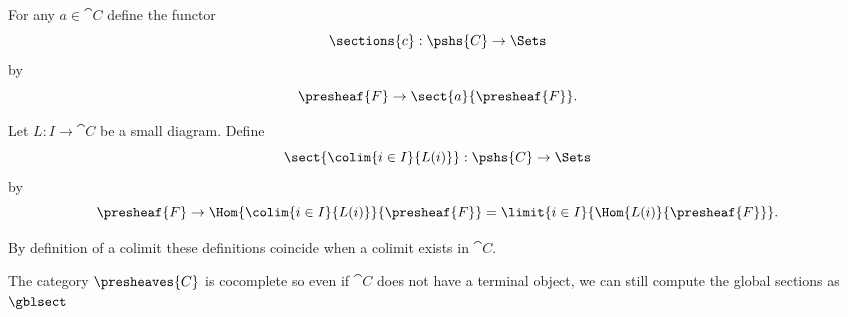 \begin{definition}
For any $a\in \cat{C}$ define the functor 
\[\sections{c}: \pshs{C} \rightarrow \Sets\]
by
\[\presheaf{F} \rightarrow \sect{a}{\presheaf{F}}.\]

Let $L: I \rightarrow \cat{C}$ be a small diagram. 
Define 
\[\sect{\colim{i \in I}{L(i)}}: \pshs{C} \rightarrow \Sets\]
by
\[\presheaf{F} \rightarrow \Hom{\colim{i\in I}{L(i)}}{\presheaf{F}} 
	= \limit{i\in I}{\Hom{L(i)}{\presheaf{F}}}.
\]

By definition of a colimit these definitions coincide when a colimit exists in $\cat{C}$.
\end{definition}

\begin{remark}
The category $\presheaves{C}$ is cocomplete 
so even if $\cat{C}$ does not have a terminal object, 
we can still compute the global sections as $\gblsect$
\end{remark}
